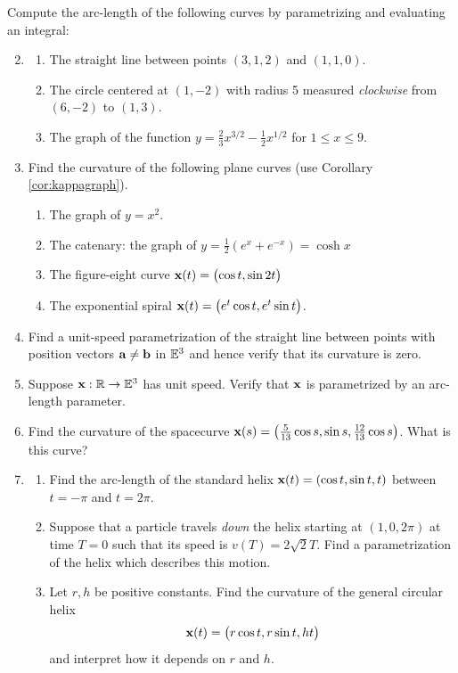 \begin{exercises}
	\exstart Compute the arc-length of the following curves by parametrizing and evaluating an integral:\vspace{-5pt}
	
	\begin{enumerate}\setcounter{enumi}{1}
	  \item[]\begin{enumerate}
	    \item The straight line between points $(3,1,2)$ and $(1,1,0)$.
	    \item The circle centered at $(1,-2)$ with radius 5 measured \emph{clockwise} from $(6,-2)$ to $(1,3)$.
	    \item The graph of the function $y=\frac 23x^{3/2}-\frac 12x^{1/2}$ for $1\le x\le 9$.
	  \end{enumerate}
	  
	  \item Find the curvature of the following plane curves (use Corollary \ref{cor:kappagraph}).
	  \begin{enumerate}
	    \item The graph of $y=x^2$.
	    \item The catenary: the graph of $y=\frac 12(e^x+e^{-x})=\cosh x$
	    \item The figure-eight curve ${\mathbf{x}}(t)=\bigl(\cos t,\sin 2t\bigr)$
	    \item\label{exs:expspiral} The exponential spiral ${\mathbf{x}}(t)=\bigl(e^t\cos t,e^t\sin t\bigr)$.
	  \end{enumerate}
	  
	  \item Find a unit-speed parametrization of the straight line between points with position vectors ${\mathbf{a}}\neq {\mathbf{b}}$ in $\mathbb{E}^3$ and hence verify that its curvature is zero.
	  	
		\item Suppose ${\mathbf{x}}:\mathbb{R}\to\mathbb{E}^3$ has unit speed. Verify that ${\mathbf{x}}$ is parametrized by an arc-length parameter.
	
	  \item Find the curvature of the spacecurve ${\mathbf{x}}(s)=\left(\frac 5{13}\cos s,\sin s,\frac{12}{13}\cos s\right)$. What is this curve?
	  
	  \item\begin{enumerate}
			\item Find the arc-length of the standard helix ${\mathbf{x}}(t)=\left(\cos t,\sin t,t\right)$ between $t=-\pi$ and $t=2\pi$.
			\item Suppose that a particle travels \emph{down} the helix starting at $(1,0,2\pi)$ at time $T=0$ such that its speed is $v(T)=2\sqrt{2}T$. Find a parametrization of the helix which describes this motion.
			\item Let $r,h$ be positive constants. Find the curvature of the general circular helix
			\[
				{\mathbf{x}}(t)=\bigl(r\cos t,r\sin t,ht\bigr)
			\]
			and interpret how it depends on $r$ and $h$.
	\end{enumerate}
	

\end{enumerate}
\end{exercises}
